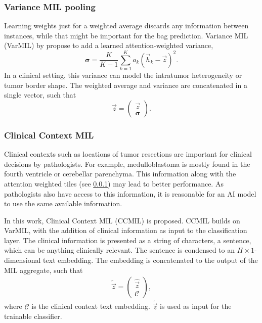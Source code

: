 \subsubsection{Variance MIL pooling}\label{subsubsection:theory_varmil}
Learning weights just for a weighted average discards any information between instances, while that might be important for the bag prediction.
Variance MIL (VarMIL) by \textcite{Schirris2022} propose to add a learned attention-weighted variance,
\begin{equation}
    \boldsymbol{\sigma} = \frac{K}{K - 1} \sum_{k=1}^{K}a_k\left(\vec{h}_k-\vec{z}\right)^2.
\end{equation}
In a clinical setting, this variance can model \eg the intratumor heterogeneity or tumor border shape.
The weighted average and variance are concatenated in a single vector, such that
\begin{equation}
    \hat{\vec{z}} =
    \begin{pmatrix}
        \vec{z} \\
        \boldsymbol{\sigma}    
    \end{pmatrix}.
\end{equation}

\subsubsection{Clinical Context MIL}
Clinical contexts such as locations of tumor resections are important for clinical decisions by pathologists.
For example, medulloblastoma is mostly found in the fourth ventricle or cerebellar parenchyma.
This information along with the attention weighted tiles (see \cref{subsubsection:theory_varmil}) may lead to better performance.
As pathologists also have access to this information, it is reasonable for an AI model to use the same available information.

In this work, Clinical Context MIL (CCMIL) is proposed.
CCMIL builds on VarMIL, with the addition of clinical information as input to the classification layer.
The clinical information is presented as a string of characters, a sentence, which can be anything clinically relevant.
The sentence is condensed to an $H\times1$-dimensional text embedding.
The embedding is concatenated to the output of the MIL aggregate, such that
\begin{align}
    \tilde{\vec{z}} =
    \begin{pmatrix}
        \hat{\vec{z}} \\
        \boldsymbol{\mathcal{C}}
    \end{pmatrix},
\end{align}
where $\boldsymbol{\mathcal{C}}$ is the clinical context text embedding.
$\tilde{\vec{z}}$ is used as input for the trainable classifier.

